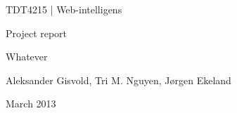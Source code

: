 \begin{titlepage}
\begin{center}
\vspace*{1in}
{\LARGE TDT4215 | Web-intelligens}
\par
\vspace{1in}
{\LARGE Project report}
\par
\vspace{1in}
{\LARGE Whatever}
\par
\vfill
\par
\vspace{0.5in}
Aleksander Gisvold, Tri M. Nguyen, Jørgen Ekeland
\par
March 2013
\end{center}
\end{titlepage}
